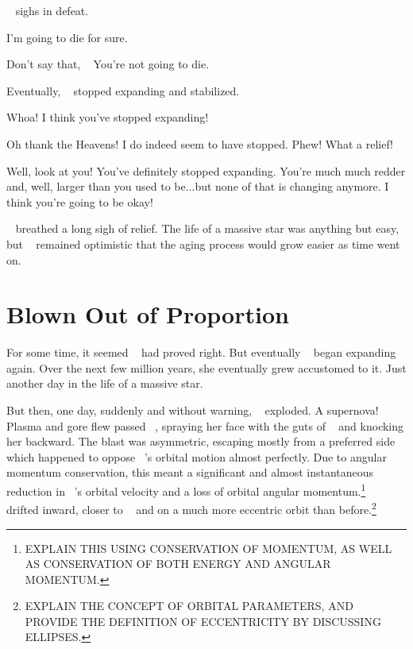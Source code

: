 \documentclass[main.tex]{subfiles}
\begin{document}
\par \nar \rmmerope~ sighs in defeat.

\par \Merope I'm going to die for sure.

\par \Maia Don't say that, \rmmerope~  You're not going to die.

\par \nar Eventually, \rmmerope~ stopped expanding and stabilized.

\par \Maia Whoa!  I think you've stopped expanding! 

\par \Merope Oh thank the Heavens!  I do indeed seem to have stopped.  Phew!  What a relief!

\par \Maia Well, look at you!  You've definitely stopped expanding.  You're much much redder and, well, larger than you used to be...but none of that is changing anymore.  I think you're going to be okay!

\par \nar \rmmerope~ breathed a long sigh of relief.  The life of a massive star was anything but easy, but \rmmerope~ remained optimistic that the aging process would grow easier as time went on.

\section{Blown Out of Proportion}

\par \nar For some time, it seemed \rmmaia~ had proved right.  But eventually \rmmerope~ began expanding again.  Over the next few million years, she eventually grew accustomed to it.  Just another day in the life of a massive star.

\par \nar But then, one day, suddenly and without warning, \rmmerope~ exploded.  A supernova!  Plasma and gore flew passed \rmmaia~, spraying her face with the guts of \rmmerope~ and knocking her backward.  The blast was asymmetric, escaping mostly from a preferred side which happened to oppose \rmmerope~'s orbital motion almost perfectly.  Due to angular momentum conservation, this meant a significant and almost instantaneous reduction in \rmmerope~'s orbital velocity and a loss of orbital angular momentum.\footnote{EXPLAIN THIS USING CONSERVATION OF MOMENTUM, AS WELL AS CONSERVATION OF BOTH ENERGY AND ANGULAR MOMENTUM.}  \rmmerope~ drifted inward, closer to \rmmaia~ and on a much more eccentric orbit than before.\footnote{EXPLAIN THE CONCEPT OF ORBITAL PARAMETERS, AND PROVIDE THE DEFINITION OF ECCENTRICITY BY DISCUSSING ELLIPSES.}  
\end{document}
